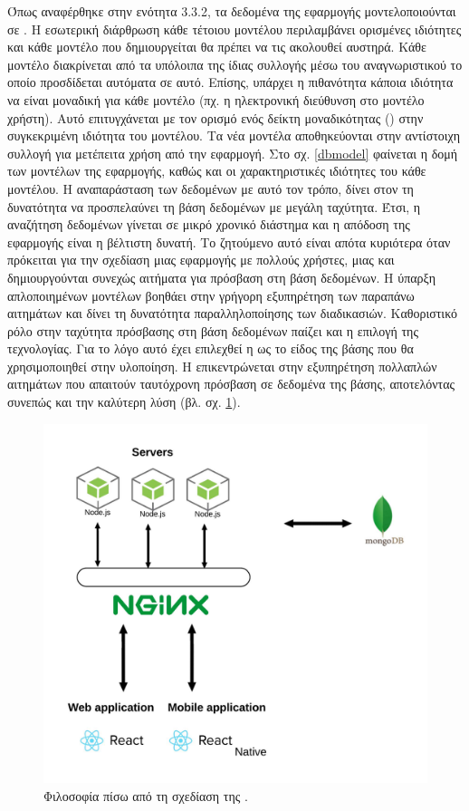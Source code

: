 Όπως αναφέρθηκε στην ενότητα 3.3.2, τα δεδομένα της εφαρμογής μοντελοποιούνται σε . Η εσωτερική διάρθρωση κάθε τέτοιου μοντέλου περιλαμβάνει ορισμένες ιδιότητες και κάθε μοντέλο που δημιουργείται θα πρέπει να τις ακολουθεί αυστηρά. Κάθε μοντέλο διακρίνεται από τα υπόλοιπα της ίδιας συλλογής μέσω του αναγνωριστικού  το οποίο προσδίδεται αυτόματα σε αυτό. Επίσης, υπάρχει η πιθανότητα κάποια ιδιότητα να είναι μοναδική για κάθε μοντέλο (πχ. η ηλεκτρονική διεύθυνση στο μοντέλο χρήστη). Αυτό επιτυγχάνεται με τον ορισμό ενός δείκτη μοναδικότητας () στην συγκεκριμένη ιδιότητα του μοντέλου. Τα νέα μοντέλα αποθηκεύονται στην αντίστοιχη συλλογή για μετέπειτα χρήση από την εφαρμογή. Στο σχ. \ref{dbmodel} φαίνεται η δομή των μοντέλων της εφαρμογής, καθώς και οι χαρακτηριστικές ιδιότητες του κάθε μοντέλου. 
\newline
\indent
Η αναπαράσταση των δεδομένων με αυτό τον τρόπο, δίνει στον  τη δυνατότητα να προσπελαύνει τη βάση δεδομένων με μεγάλη ταχύτητα. Έτσι, η αναζήτηση δεδομένων γίνεται σε μικρό χρονικό διάστημα και η απόδοση της εφαρμογής είναι η βέλτιστη δυνατή. Το ζητούμενο αυτό είναι απότα κυριότερα όταν πρόκειται για την σχεδίαση μιας εφαρμογής με πολλούς χρήστες, μιας και δημιουργούνται συνεχώς αιτήματα για πρόσβαση στη βάση δεδομένων. Η ύπαρξη απλοποιημένων μοντέλων βοηθάει στην γρήγορη εξυπηρέτηση των παραπάνω αιτημάτων και δίνει τη δυνατότητα παραλληλοποίησης των διαδικασιών.
\newline
\indent
Καθοριστικό ρόλο στην ταχύτητα πρόσβασης στη βάση δεδομένων παίζει και η επιλογή της τεχνολογίας. Για το λόγο αυτό έχει επιλεχθεί η  ως το είδος της βάσης που θα χρησιμοποιηθεί στην υλοποίηση. Η  επικεντρώνεται στην εξυπηρέτηση πολλαπλών αιτημάτων που απαιτούν ταυτόχρονη πρόσβαση σε δεδομένα της βάσης, αποτελόντας συνεπώς και την καλύτερη λύση (βλ. σχ. \ref{mondodb}).

\begin{figure}[H]
    \centering
    \includegraphics[scale=0.6]{figures/mongoDB-strucure.png}
    \caption{Φιλοσοφία πίσω από τη σχεδίαση της .}
    \label{mondodb}
\end{figure}

